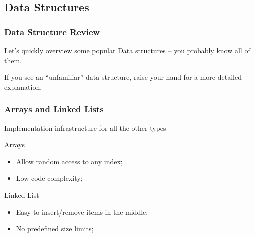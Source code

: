 \subsection{Data Structures}

\begin{frame}
  \frametitle{Data Structure Review}
  \begin{block}{}
    Let's quickly overview some popular Data structures -- you
    probably know all of them.
  \end{block}
  \begin{block}{}
    If you see an ``unfamiliar'' data structure, raise your hand for a
    more detailed explanation.
  \end{block}
\end{frame}

\begin{frame}
  \frametitle{Arrays and Linked Lists}
  \begin{center}
    Implementation infrastructure for all the other types
  \end{center}
  \begin{block}{Arrays}
    \begin{itemize}
    \item Allow random access to any index;
    \item Low code complexity;
    \end{itemize}
  \end{block}
  \begin{block}{Linked List}
    \begin{itemize}
    \item Easy to insert/remove items in the middle;
    \item No predefined size limits;      
    \end{itemize}
  \end{block}

\end{frame}


